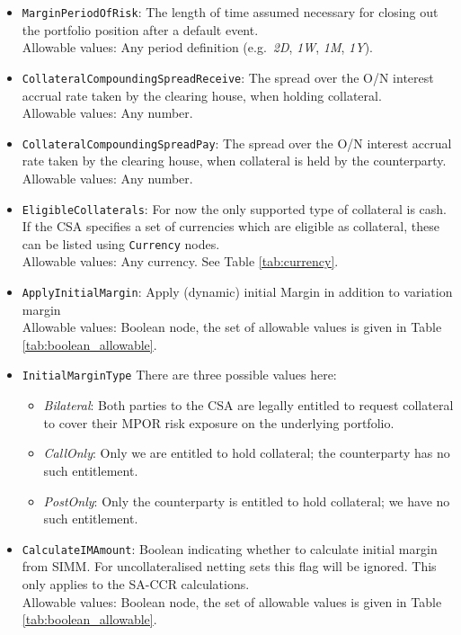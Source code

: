 \begin{itemize}
  \item \lstinline!MarginPeriodOfRisk!: The length of time assumed necessary
  for closing out the portfolio position after a default event. \\
    Allowable values: Any period definition (e.g.\ \emph{2D}, \emph{1W}, \emph{1M},
      \emph{1Y}).

  \item \lstinline!CollateralCompoundingSpreadReceive!: The spread over the O/N
  interest accrual rate taken by the clearing house, when holding
  collateral. \\
  Allowable values: Any number.

  \item \lstinline!CollateralCompoundingSpreadPay!: The spread over the O/N
  interest accrual rate taken by the clearing house, when collateral is
  held by the counterparty. \\
  Allowable values: Any number.

  \item \lstinline!EligibleCollaterals!: For now the only supported type of
  collateral is cash. If the CSA specifies a set of currencies which
  are eligible as collateral, these can be listed using
  \lstinline!Currency! nodes. \\
  Allowable values: Any currency. See Table \ref{tab:currency}.

  \item \lstinline!ApplyInitialMargin!: Apply (dynamic) initial Margin in
  addition to variation margin \\
  Allowable values: Boolean node, the set of allowable values is given in
  Table \ref{tab:boolean_allowable}.

  \item \lstinline!InitialMarginType! There are three possible values here:
  \begin{itemize}
    \item \emph{Bilateral}: Both parties to the CSA are legally entitled to
      request collateral to cover their MPOR risk exposure
      on the underlying portfolio.
    \item \emph{CallOnly}: Only we are entitled to hold collateral; the
      counterparty has no such entitlement.
    \item \emph{PostOnly}: Only the counterparty is entitled to hold collateral;
      we have no such entitlement.
  \end{itemize}

  \item \lstinline!CalculateIMAmount!: Boolean indicating whether to calculate
    initial margin from SIMM. For uncollateralised netting sets
    this flag will be ignored. This only applies to the SA-CCR
    calculations. \\
    Allowable values: Boolean node, the set of allowable values is given in
    Table \ref{tab:boolean_allowable}.


\end{itemize}
